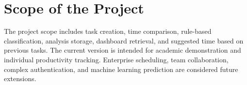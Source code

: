 \section{Scope of the Project}
\begin{justify}
The project scope includes task creation, time comparison, rule-based classification, analysis storage, dashboard retrieval, and suggested time based on previous tasks. The current version is intended for academic demonstration and individual productivity tracking. Enterprise scheduling, team collaboration, complex authentication, and machine learning prediction are considered future extensions.
\end{justify}

